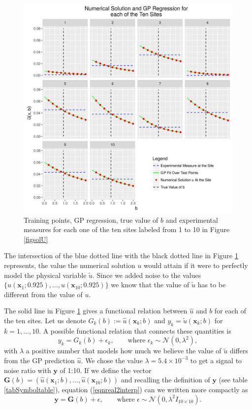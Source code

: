 \documentclass[12pt]{book}
\newcommand{\x}{\textbf{x}}
\newcommand{\y}{\textbf{y}}
\begin{document}
\begin{figure}[H]
\centering
\includegraphics[scale=0.7]{./FigChap3/fitted}
\caption{Training points, GP regression, true value of $b$ and experimental measures for each one of the ten sites labeled
from 1 to 10 in Figure \ref{figsolU}}
\label{fignofitted}
\end{figure}

The intersection of the blue dotted line with the black dotted line in Figure \ref{fignofitted} represents, 
the value the numerical 
solution $u$  would attain  if it were to  perfectly model the physical variable $\tilde{u}$. 
Since we added noise to the values
$\{u(\x_{1};0.925),\ldots,u(\x_{10};0.925)\}$ we know that the value of $\tilde{u}$ has to be different 
from the value of $u$.
\newline

The solid line in Figure \ref{fignofitted} gives a functional relation between $\hat{u}$ and $b$ for each of the 
ten sites.
Let us denote $G_{k}(b):=\hat{u}(\x_{k};b)$ and $y_{k}=\tilde{u}(\x_{k};b)$ for $k=1,\ldots,10$. A possible 
functional relation
that connects these quantities is
\begin{equation}\label{eqnreal2interp}
y_{k}=G_{k}(b)+\epsilon_{k},\qquad\text{where } \epsilon_{k}\sim\mathcal{N}(0,\lambda^{2}),
\end{equation}
with $\lambda$ a positive number that models how much we believe the value of $\tilde{u}$ differs from the GP prediction $\hat{u}$. 
We chose the value $\lambda=5.4\times 10^{-3}$ to get a signal to noise ratio with $\y$ of 1:10.
If we define the vector  
$\textbf{G}(b)=(\hat{u}(\x_{1};b),\ldots,\hat{u}(\x_{10};b))$ and recalling the definition of $\y$ 
(see table \ref{tabSymboltable}), equation (\ref{eqnreal2interp}) can we written more compactly as
\begin{equation}\label{eqnvector2interp}
\textbf{y}=\textbf{G}(b)+\epsilon,\qquad\text{where }\epsilon\sim\mathcal{N}(0,\lambda^{2} I_{10\times 10}).
\end{equation}
\end{document}
